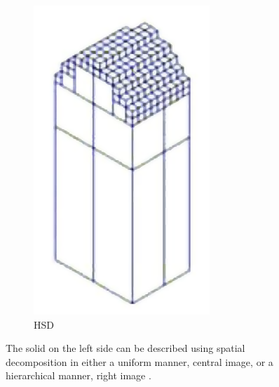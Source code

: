 \begin{description}
\begin{figure}[H]
\begin{subfigure}[b]{0.2\textwidth}
			\includegraphics[width=\textwidth]{images/spatial_decomposition_hsd}
			\caption{HSD}
			\label{fig:spatial_decomposition_hsd}
		\end{subfigure}
		\caption{
			The solid on the left side can be described using spatial decomposition in either a uniform manner, central image, or a hierarchical manner, right image \cite{virtual_machining_review}.
		}
		\label{fig:spatial_decomposition}
	\end{figure}



\end{description}
